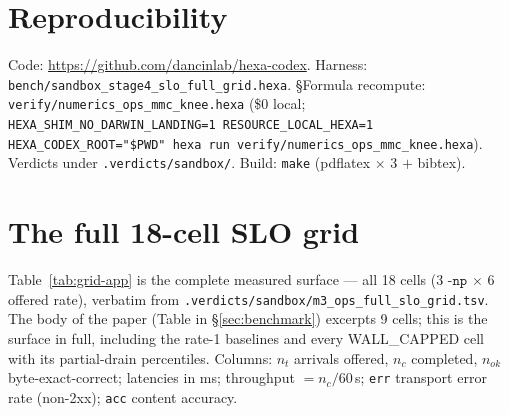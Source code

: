 \documentclass[11pt,a4paper]{article}
\begin{document}
\section*{Reproducibility}
Code: \url{https://github.com/dancinlab/hexa-codex}. Harness:
\texttt{bench/sandbox\_stage4\_slo\_full\_grid.hexa}. \S Formula recompute:
\texttt{verify/numerics\_ops\_mmc\_knee.hexa} (\$0 local;
\texttt{HEXA\_SHIM\_NO\_DARWIN\_LANDING=1 RESOURCE\_LOCAL\_HEXA=1
HEXA\_CODEX\_ROOT="\$PWD" hexa run verify/numerics\_ops\_mmc\_knee.hexa}).
Verdicts under \texttt{.verdicts/sandbox/}. Build: \texttt{make} (pdflatex
\(\times\) 3 \(+\) bibtex).

\appendix

\section{The full 18-cell SLO grid}
\label{app:grid}
Table~\ref{tab:grid-app} is the complete measured surface --- all 18 cells
(3 \(\texttt{-np}\) \(\times\) 6 offered rate), verbatim from
\texttt{.verdicts/sandbox/m3\_ops\_full\_slo\_grid.tsv}. The body of the paper
(Table in \S\ref{sec:benchmark}) excerpts 9 cells; this is the surface in full,
including the rate-1 baselines and every WALL\_CAPPED cell with its partial-drain
percentiles. Columns: \(n_t\) arrivals offered, \(n_c\) completed, \(n_{ok}\)
byte-exact-correct; latencies in ms; throughput \(=n_c/60\)\,s; \texttt{err}
transport error rate (non-2xx); \texttt{acc} content accuracy.
\end{document}
